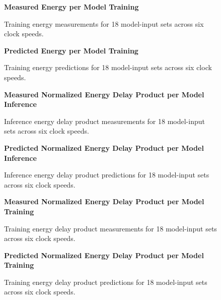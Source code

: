 \begin{figure}[htbp]
    \centering
    \parbox{1.1\textwidth}{\centering\textbf{Measured Energy per Model Training}}
    \caption{Training energy measurements for 18 model-input sets across six clock speeds.}
    \label{fig:grpfmenergytrain}
    \vspace{0.2cm}
    \parbox{1.1\textwidth}{\centering\textbf{Predicted Energy per Model Training}}
    \caption{Training energy predictions for 18 model-input sets across six clock speeds.}
    \label{fig:grppredenergytrain}
\end{figure}



\begin{figure}[htbp]
    \centering
    \parbox{1.1\textwidth}{\centering\textbf{Measured Normalized Energy Delay Product per Model Inference}}
    \caption{Inference energy delay product measurements for 18 model-input sets across six clock speeds.}
    \label{fig:grppdpfminf}
    \vspace{0.2cm}
    \parbox{1.1\textwidth}{\centering\textbf{Predicted Normalized Energy Delay Product per Model Inference}}
    \caption{Inference energy delay product predictions for 18 model-input sets across six clock speeds.}
    \label{fig:grppdppredinf}
\end{figure}



\begin{figure}[htbp]
    \centering
    \parbox{1.1\textwidth}{\centering\textbf{Measured Normalized Energy Delay Product per Model Training}}
    \caption{Training energy delay product measurements for 18 model-input sets across six clock speeds.}
    \label{fig:grppdpfmtrain}
    \vspace{0.2cm}
    \parbox{1.1\textwidth}{\centering\textbf{Predicted Normalized Energy Delay Product per Model Training}}
    \caption{Training energy delay product predictions for 18 model-input sets across six clock speeds.}
    \label{fig:grppdppredtrain}
\end{figure}

